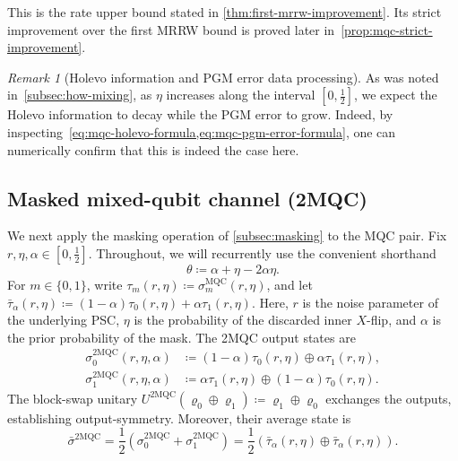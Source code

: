 \documentclass[11pt]{article}
\theoremstyle{remark}
\newtheorem{remark}{Remark}[section]
\newcommand{\bits}{\{0,1\}}
\newcommand{\MQC}{\mathrm{MQC}}
\newcommand{\mMQC}{2\mathrm{MQC}}
\begin{document}
This is the rate upper bound stated in \cref{thm:first-mrrw-improvement}. Its strict improvement over the first MRRW bound is proved later in~\cref{prop:mqc-strict-improvement}.

\begin{remark}[Holevo information and PGM error data processing]
\label{rem:mqc-data-processing}
As was noted in~\cref{subsec:how-mixing}, as $\eta$ increases along the interval $[0,\frac{1}{2}]$, we expect the Holevo information to decay while the PGM error to grow. Indeed, by inspecting~\cref{eq:mqc-holevo-formula,eq:mqc-pgm-error-formula}, one can numerically confirm that this is indeed the case here.
\end{remark}

\subsection{Masked mixed-qubit channel (2MQC)}
\label{subsec:2mqc}

We next apply the masking operation of \cref{subsec:masking} to the MQC pair. Fix $r,\eta,\alpha \in [0,\frac{1}{2}]$. Throughout, we will recurrently use the convenient shorthand 
\begin{equation}
\label{eq:theta-shorthand}
\theta \coloneqq \alpha+\eta-2\alpha\eta.
\end{equation}
For $m \in \bits$, write $\tau_m(r,\eta) \coloneqq \sigma_m^{\MQC}(r,\eta)$, and let $\bar{\tau}_\alpha(r,\eta) \coloneqq (1-\alpha)\tau_0(r,\eta)+\alpha\tau_1(r,\eta)$. Here, $r$ is the noise parameter of the underlying PSC, $\eta$ is the probability of the discarded inner $X$-flip, and $\alpha$ is the prior probability of the mask. The 2MQC output states are
\begin{align*}
\sigma_0^{\mMQC}(r,\eta,\alpha) &\coloneqq (1-\alpha)\tau_0(r,\eta) \oplus \alpha\tau_1(r,\eta), \\
\sigma_1^{\mMQC}(r,\eta,\alpha) &\coloneqq \alpha\tau_1(r,\eta) \oplus (1-\alpha)\tau_0(r,\eta).
\end{align*}
The block-swap unitary $U^{\mMQC}(\varrho_0 \oplus \varrho_1) \coloneqq \varrho_1 \oplus \varrho_0$ exchanges the outputs, establishing output-symmetry. Moreover, their average state is
\begin{equation*}
\bar{\sigma}^{\mMQC}
=\frac{1}{2}\left(\sigma_0^{\mMQC}+\sigma_1^{\mMQC}\right)
=\frac{1}{2}\left(\bar{\tau}_\alpha(r,\eta) \oplus \bar{\tau}_\alpha(r,\eta)\right).
\end{equation*}
\end{document}
